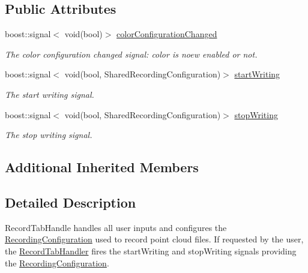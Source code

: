 \subsection*{Public Attributes}
\begin{DoxyCompactItemize}
\item 
\hypertarget{class_record_tab_handler_a4c46c36196133f6f24960c4946c0aebc}{}boost\+::signal$<$ void(bool)$>$ \hyperlink{class_record_tab_handler_a4c46c36196133f6f24960c4946c0aebc}{color\+Configuration\+Changed}\label{class_record_tab_handler_a4c46c36196133f6f24960c4946c0aebc}

\begin{DoxyCompactList}\small\item\em The color configuration changed signal\+: color is noew enabled or not. \end{DoxyCompactList}\item 
\hypertarget{class_record_tab_handler_a714535ef2c737bbde7b9ceff8404e41b}{}boost\+::signal$<$ void(bool, Shared\+Recording\+Configuration)$>$ \hyperlink{class_record_tab_handler_a714535ef2c737bbde7b9ceff8404e41b}{start\+Writing}\label{class_record_tab_handler_a714535ef2c737bbde7b9ceff8404e41b}

\begin{DoxyCompactList}\small\item\em The start writing signal. \end{DoxyCompactList}\item 
\hypertarget{class_record_tab_handler_a929a4811350c7ff4ffe913d6a7f42c9b}{}boost\+::signal$<$ void(bool, Shared\+Recording\+Configuration)$>$ \hyperlink{class_record_tab_handler_a929a4811350c7ff4ffe913d6a7f42c9b}{stop\+Writing}\label{class_record_tab_handler_a929a4811350c7ff4ffe913d6a7f42c9b}

\begin{DoxyCompactList}\small\item\em The stop writing signal. \end{DoxyCompactList}\end{DoxyCompactItemize}
\subsection*{Additional Inherited Members}


\subsection{Detailed Description}
Record\+Tab\+Handle handles all user inputs and configures the \hyperlink{class_recording_configuration}{Recording\+Configuration} used to record point cloud files. If requested by the user, the \hyperlink{class_record_tab_handler}{Record\+Tab\+Handler} fires the start\+Writing and stop\+Writing signals providing the \hyperlink{class_recording_configuration}{Recording\+Configuration}. 


